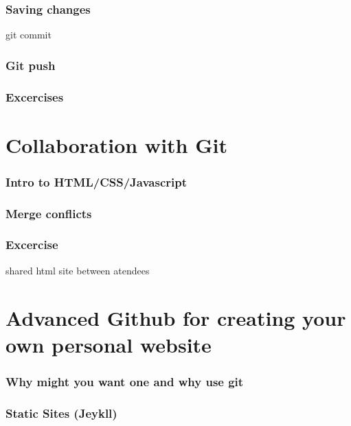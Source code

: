 \documentclass[aspectratio=169]{beamer}
\begin{document}
    \begin{frame}
        \frametitle{Saving changes}

        git commit
    
    \end{frame}

    \begin{frame}
        \frametitle{Git push}
    
        
    
    \end{frame}

    \begin{frame}
        \frametitle{Excercises}
    
        
    
    \end{frame}

    \section{Collaboration with Git}

    \begin{frame}
        \frametitle{Intro to HTML/CSS/Javascript}
    
        
    
    \end{frame}

    \begin{frame}
        \frametitle{Merge conflicts}
    
        
    
    \end{frame}

    \begin{frame}
        \frametitle{Excercise}
    
        shared html site between atendees
    
    \end{frame}

    \section{Advanced Github for creating your own personal website}

    \begin{frame}
        \frametitle{Why might you want one and why use git}
        
    
    \end{frame}

    \begin{frame}
        \frametitle{Static Sites (Jeykll)}
    
        
    
    \end{frame}
\end{document}
